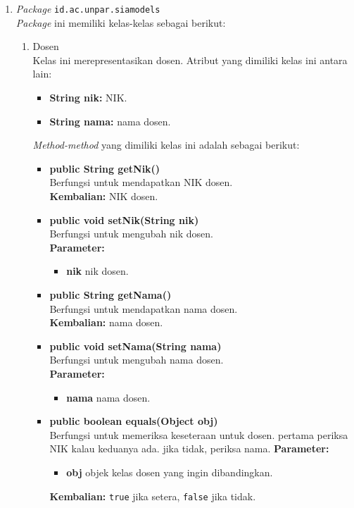\begin{enumerate}
	\item \textit{Package} \texttt{id.ac.unpar.siamodels}\\
	\textit{Package} ini memiliki kelas-kelas sebagai berikut:
	\begin{enumerate}
		\item Dosen\\
		Kelas ini merepresentasikan dosen. Atribut yang dimiliki kelas ini antara lain:
		\begin{itemize}
			\item \textbf{String nik:} NIK.
			\item \textbf{String nama:} nama dosen.
		\end{itemize}
	\textit{Method-method} yang dimiliki kelas ini adalah sebagai berikut:
		\begin{itemize}
			\item \textbf{public String getNik()}\\
				Berfungsi untuk mendapatkan NIK dosen.\\
				\textbf{Kembalian:} NIK dosen.

			\item \textbf{public void setNik(String nik)}\\
				Berfungsi untuk mengubah nik dosen.\\
				\textbf{Parameter:}
				\begin{itemize}
					\item \textbf{nik} nik dosen.
				\end{itemize}
				
			\item \textbf{public String getNama()}\\
				Berfungsi untuk mendapatkan nama dosen.\\
				\textbf{Kembalian:} nama dosen.

			\item \textbf{public void setNama(String nama)}\\
				Berfungsi untuk mengubah nama dosen.\\
				\textbf{Parameter:}
				\begin{itemize}
					\item \textbf{nama} nama dosen.
				\end{itemize}
				
			\item \textbf{public boolean equals(Object obj)}\\
			Berfungsi untuk memeriksa keseteraan untuk dosen. pertama periksa NIK kalau keduanya ada. jika tidak, periksa nama.
			\textbf{Parameter:}
			\begin{itemize}
				\item \textbf{obj} objek kelas dosen yang ingin dibandingkan.
			\end{itemize}
			\textbf{Kembalian:} \texttt{true} jika setera, \texttt{false} jika tidak.
		\end{itemize}						
		

\end{enumerate}
\end{enumerate}
